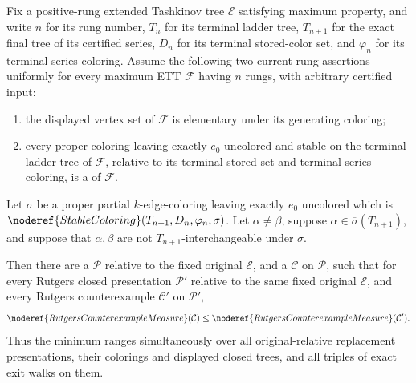 \begin{lemma}
Fix a positive-rung extended Tashkinov tree \(\mathcal E\) satisfying
maximum property, and write \(n\) for its rung number,
\(T_n\) for its terminal ladder tree, \(T_{n+1}\) for the exact final
tree of its certified series, \(D_n\) for its terminal stored-color set,
and \(\varphi_n\) for its terminal series coloring.  Assume the following
two current-rung assertions uniformly for every maximum ETT
\(\mathcal F\) having \(n\) rungs, with arbitrary certified input:
\begin{enumerate}
\item the displayed vertex set of \(\mathcal F\) is elementary under its
generating coloring;
\item every proper coloring leaving exactly \(e_0\) uncolored and stable
on the terminal ladder tree of \(\mathcal F\), relative to its terminal
stored set and terminal series coloring, is a
 of \(\mathcal F\).
\end{enumerate}
Let \(\sigma\) be a proper partial \(k\)-edge-coloring leaving exactly
\(e_0\) uncolored which is
\(\noderef{StableColoring}(T_{n+1},D_n,\varphi_n,\sigma)\).
Let \(\alpha\ne\beta\), suppose
\(\alpha\in\overline\sigma(T_{n+1})\), and suppose that \(\alpha,\beta\)
are not \(T_{n+1}\)-interchangeable under \(\sigma\).

Then there are a 
\(\mathcal P\) relative to the fixed original \(\mathcal E\), and a
 \(\mathcal C\) on \(\mathcal P\), such
that for every Rutgers closed presentation \(\mathcal P'\) relative to
the same fixed original \(\mathcal E\), and every Rutgers counterexample
\(\mathcal C'\) on \(\mathcal P'\),
\[
 \noderef{RutgersCounterexampleMeasure}(\mathcal C)
 \leq
 \noderef{RutgersCounterexampleMeasure}(\mathcal C').
\]
Thus the minimum ranges simultaneously over all original-relative
replacement presentations, their colorings and displayed closed trees,
and all triples of exact exit walks on them.
\end{lemma}
